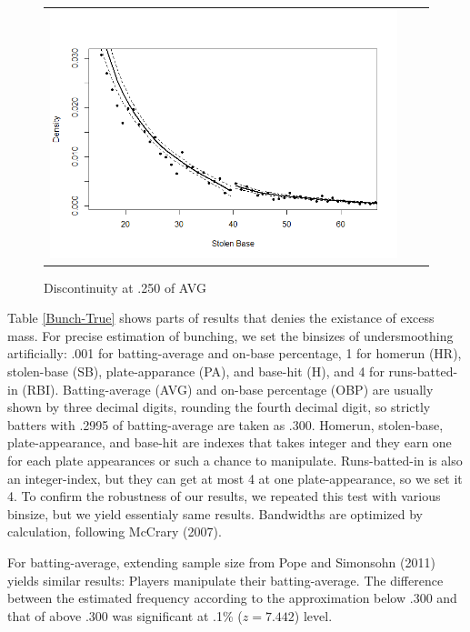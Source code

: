 \documentclass[dvipdfmx, 12pt]{article}
\begin{document}
\begin{figure}
\begin{tabular}{ccc}
          \multicolumn{1}{r}{
          \begin{minipage}{.4\textwidth}
            \includegraphics[keepaspectratio, scale = 0.5, angle = 0]{graphs/SB_40.png}
            \caption{Discontinuity at .250 of AVG}
            \label{DCdensity_SB_40}
          \end{minipage}
          }
        \end{tabular}
      \end{figure}

Table \ref{Bunch-True} shows parts of results that denies the existance of excess mass. For precise estimation of bunching, we set the binsizes of undersmoothing artificially: .001 for batting-average and on-base percentage, 1 for homerun (HR), stolen-base (SB), plate-apparance (PA), and base-hit (H), and 4 for runs-batted-in (RBI). Batting-average (AVG) and on-base percentage (OBP) are usually shown by three decimal digits, rounding the fourth decimal digit, so strictly batters with .2995 of batting-average are taken as .300. Homerun, stolen-base, plate-appearance, and base-hit are indexes that takes integer and they earn one for each plate appearances or such a chance to manipulate. Runs-batted-in is also an integer-index, but they can get at most 4 at one plate-appearance, so we set it 4. To confirm the robustness of our results, we repeated this test with various binsize, but we yield essentialy same results. Bandwidths are optimized by calculation, following McCrary (2007).


For batting-average, extending sample size from Pope and Simonsohn (2011) yields similar results: Players manipulate their batting-average. The difference between the estimated frequency according to the approximation below .300 and that of above .300 was significant at .1\% ($z=7.442$) level.
\end{document}

